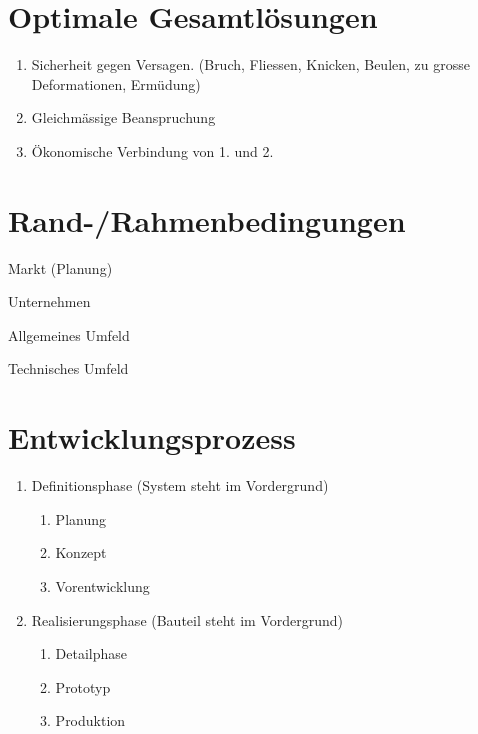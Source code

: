 
\section{Optimale Gesamtlösungen} %
	\begin{enumerate}
		\item Sicherheit gegen Versagen. (Bruch, Fliessen, Knicken, Beulen, zu grosse Deformationen, Ermüdung)
		\item Gleichmässige Beanspruchung
		\item Ökonomische Verbindung von 1. und 2.
	\end{enumerate}
\section{Rand-/Rahmenbedingungen} %
	\begin{tightitemize}
		\item Markt (Planung)
		\item Unternehmen
		\item Allgemeines Umfeld
		\item Technisches Umfeld
	\end{tightitemize}
\section{Entwicklungsprozess} %
	\begin{enumerate}
		\item Definitionsphase (System steht im Vordergrund)
			\begin{enumerate}
			\item Planung
			\item Konzept
			\item Vorentwicklung
			\end{enumerate}
		\item Realisierungsphase (Bauteil steht im Vordergrund)
			\begin{enumerate}
			\item Detailphase
			\item Prototyp
			\item Produktion
			\end{enumerate}
	\end{enumerate}
	

